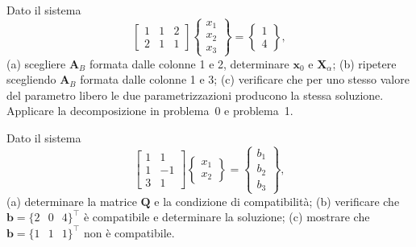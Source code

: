 \begin{esercizio} 
	Dato il sistema
	\begin{equation*}
		\begin{bmatrix} 1 & 1 & 2 \\ 2 & 1 & 1 \end{bmatrix}
		\begin{Bmatrix} x_1 \\ x_2 \\ x_3 \end{Bmatrix}
		= \begin{Bmatrix} 1 \\ 4 \end{Bmatrix},
	\end{equation*}
	(a) scegliere $\bm{A}_B$ formata dalle colonne 1 e 2, determinare
	$\bm{x}_0$ e $\bm{X}_\alpha$; (b) ripetere scegliendo $\bm{A}_B$
	formata dalle colonne 1 e 3; (c) verificare che per uno stesso
	valore del parametro libero le due parametrizzazioni producono la
	stessa soluzione. Applicare la decomposizione in problema~0 e
	problema~1.
\end{esercizio} 

\begin{esercizio} 
	Dato il sistema
	\begin{equation*}
		\begin{bmatrix} 1 & 1 \\ 1 & -1 \\ 3 & 1 \end{bmatrix}
		\begin{Bmatrix} x_1 \\ x_2 \end{Bmatrix}
		= \begin{Bmatrix} b_1 \\ b_2 \\ b_3 \end{Bmatrix},
	\end{equation*}
	(a) determinare la matrice $\bm{Q}$ e la condizione di compatibilit\`a;
	(b) verificare che $\bm{b}=\{2\,\;\;0\,\;\;4\}^\top$ \`e compatibile e
	determinare la soluzione; (c) mostrare che
	$\bm{b}=\{1\,\;\;1\,\;\;1\}^\top$ non \`e compatibile.
\end{esercizio} 


